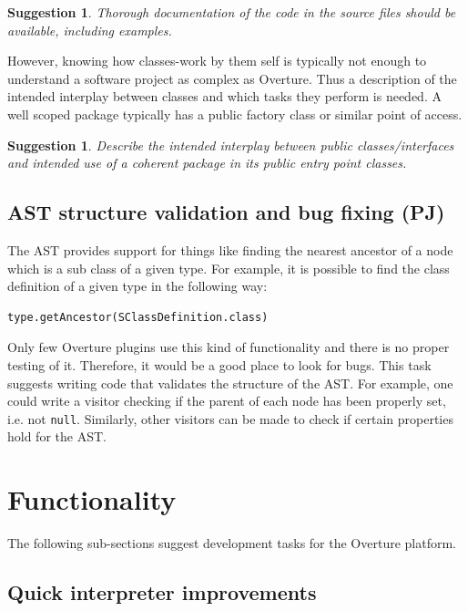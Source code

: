 \documentclass[11pt]{overturerep} \usepackage{t1enc,times,a4,t1enc}
\newtheorem{sug}[subsection]{Suggestion}
\begin{document}
\begin{sug} Thorough documentation of the code in the source files should be
available, including examples. \end{sug}

However, knowing how classes-work by them self is typically not enough to
understand a software project as complex as Overture.  Thus a description of
the intended interplay between classes and which tasks they perform is needed.
A well scoped package typically has a public factory class or similar point of
access.

\begin{sug} Describe the intended interplay between \emph{public}
classes/interfaces and intended use of a coherent package in its public entry
point classes.  \end{sug}


\section{AST structure validation and bug fixing (PJ)}

The AST provides support for things like finding the nearest ancestor of a node
which is a sub class of a given type. For example, it is possible to find the
class definition of a given type in the following way:

\begin{lstlisting}
type.getAncestor(SClassDefinition.class)
\end{lstlisting}

Only few Overture plugins use this kind of functionality and there is no proper
testing of it. Therefore, it would be a good place to look for bugs. This task
suggests writing code that validates the structure of the AST. For example, one
could write a visitor checking if the parent of each node has been properly
set, i.e. not \texttt{null}. Similarly, other visitors can be made to check if
certain properties hold for the AST.







\chapter{Functionality}

The following sub-sections suggest development tasks for the Overture platform.

\section{Quick interpreter improvements}
\end{document}
